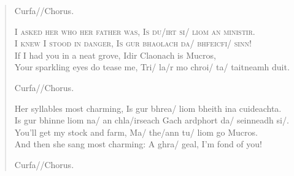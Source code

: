 \documentclass{article}
\begin{document}
\begin{verse}
\qquad Curfa//\english Chorus.
         
\upshape

{\scshape\english I asked her who her father was, \quad
\irish Is du/irt si/ liom an ministir. \\
\english I knew I stood in danger, \quad
\irish Is gur bhaolach da/ bhfeicfi/ sinn!} \\
\let\english\cmvtt   \let\irish\eiadvtt
\english If I had you in a neat grove, \quad
\irish Idir Claonach is Mucros, \\
\english Your sparkling eyes do tease me, \quad
\irish Tri/ la/r mo chroi/ ta/ taitneamh duit.

\qquad Curfa//\english Chorus.
         
\let\english\cmdh   \let\irish\eiaddh
\english Her syllables most charming, \quad
\irish Is gur bhrea/ liom bheith ina cuideachta. \\
Is gur bhinne liom na/ an chla/irseach \quad
Gach ardphort da/ seinneadh si/. \\
\let\english\cmfib   \let\irish\eiadfib
\english You'll get my stock and farm, \quad
\irish Ma/ the/ann tu/ liom go Mucros. \\
\english And then she sang most charming: \quad
\irish A ghra/ geal, \english I'm fond of you!

\qquad \irish Curfa//\english Chorus.
\end{verse}
\end{document}
